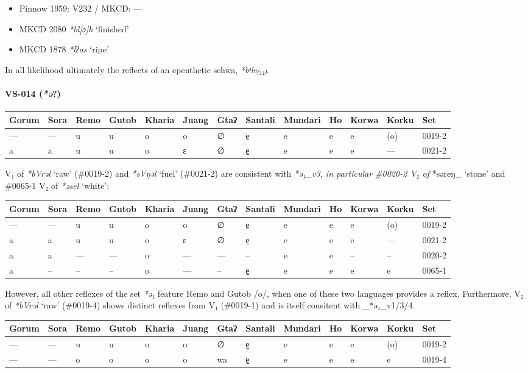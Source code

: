 \documentclass[a4paper,]{article}
\let\oldparagraph\paragraph
\renewcommand{\paragraph}[1]{\oldparagraph{#1}\mbox{}}
\begin{document}
\begin{itemize}
\item
  Pinnow 1959: V232 / MKCD: ---
\item
  MKCD 2080 \emph{*bl{[}ɔ{]}h} `finished'
\item
  MKCD 1878 \emph{*lʔas} `ripe'
\end{itemize}

In all likelihood ultimately the reflects of an epenthetic schwa,
\emph{*bᵊlv₍₁₁₎}.

\paragraph{\texorpdfstring{VS-014
(\emph{*ə}?)}{VS-014 (*ə?)}}\label{vs-014-ux259}

\begin{longtable}[]{@{}lllllllllllll@{}}
\toprule
Gorum & Sora & Remo & Gutob & Kharia & Juang & Gtaʔ & Santali & Mundari
& Ho & Korwa & Korku & Set\tabularnewline
\midrule
\endhead
--- & --- & u & u & o & o & ∅ & e̠ & e & e & e & (o) &
0019-2\tabularnewline
a & a & u & u & o & ɛ & ∅ & e̠ & e & e & e & --- & 0021-2\tabularnewline
\bottomrule
\end{longtable}

V₁ of \emph{*bVrəl} `raw' (\#0019-2) and \emph{*sVŋəl} `fuel' (\#0021-2)
are consistent with \emph{*ə₁\_v3, in particular \#0020-2 V₂ of
}*səreŋ\_ `stone' and \#0065-1 V₂ of \emph{*əsel} `white':

\begin{longtable}[]{@{}lllllllllllll@{}}
\toprule
Gorum & Sora & Remo & Gutob & Kharia & Juang & Gtaʔ & Santali & Mundari
& Ho & Korwa & Korku & Set\tabularnewline
\midrule
\endhead
--- & --- & u & u & o & o & ∅ & e̠ & e & e & e & (o) &
0019-2\tabularnewline
a & a & u & u & o & ɛ & ∅ & e̠ & e & e & e & --- & 0021-2\tabularnewline
a & a & --- & --- & o & --- & --- & -- & e & e & -- & -- &
0020-2\tabularnewline
a & -- & -- & -- & o & --- & -- & e̠ & e & e & e & e &
0065-1\tabularnewline
\bottomrule
\end{longtable}

However, all other reflexes of the set \emph{*ə₁} feature Remo and Gutob
/o/, when one of these two languages provides a reflex. Furthermore, V₂
of \emph{*bVrəl} `raw' (\#0019-4) shows distinct reflexes from V₁
(\#0019-1) and is itself consitent with \_*ə₁\_v1/3/4.

\begin{longtable}[]{@{}lllllllllllll@{}}
\toprule
Gorum & Sora & Remo & Gutob & Kharia & Juang & Gtaʔ & Santali & Mundari
& Ho & Korwa & Korku & Set\tabularnewline
\midrule
\endhead
--- & --- & u & u & o & o & ∅ & e̠ & e & e & e & (o) &
0019-2\tabularnewline
--- & --- & o & o & o & o & wa & e̠ & e & e & e & e &
0019-4\tabularnewline
\bottomrule
\end{longtable}
\end{document}
